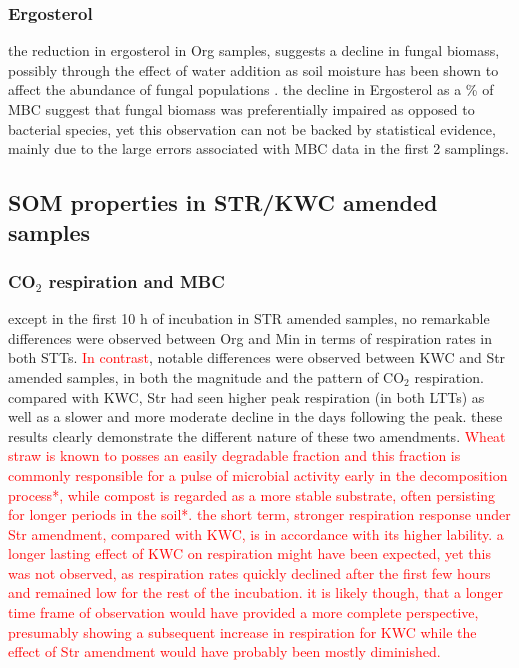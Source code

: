 \documentclass[12pt]{report}
\newcommand{\myRed}[1]{\textcolor{red}{#1}} %
\begin{document}
		\subsubsection{Ergosterol}
			
			the reduction in ergosterol in Org samples, suggests a decline in fungal biomass, possibly through the effect of water addition as soil moisture has been shown to affect the abundance of fungal populations \citep{drenovsky2004, griffin1963}. the decline in Ergosterol as a \% of MBC suggest that fungal biomass was preferentially impaired as opposed to bacterial species, yet this observation can not be backed by statistical evidence, mainly due to the large errors associated with MBC data in the first 2 samplings.  
			
	\subsection{SOM properties in STR/KWC amended samples}
	
		\subsubsection{CO$_2 $ respiration and MBC}
			
			except in the first 10 h of incubation in STR amended samples, no remarkable differences were observed between Org and Min in terms of respiration rates in both STTs. \myRed{In contrast}, notable differences were observed between KWC and Str amended samples, in both the magnitude and the pattern of CO$ _2 $ respiration. compared with KWC, Str had seen higher peak respiration (in both LTTs) as well as a slower and more moderate decline in the days following the peak. these results clearly demonstrate the different nature of these two amendments. \myRed{Wheat straw is known to posses an easily degradable fraction and this fraction is commonly responsible for a pulse of microbial activity early in the decomposition process\myRed{*}, while compost is regarded as a more stable substrate, often persisting for longer periods in the soil\myRed{*}. the short term, stronger respiration response under Str amendment, compared with KWC, is in accordance with its higher lability. a longer lasting effect of KWC on respiration might have been expected, yet this was not observed, as respiration rates quickly declined after the first few hours and remained low for the rest of the incubation. it is likely though, that a longer time frame of observation would have provided a more complete perspective, presumably showing a subsequent increase in respiration for KWC  while the effect of Str amendment would have probably been mostly diminished.}
\end{document}
